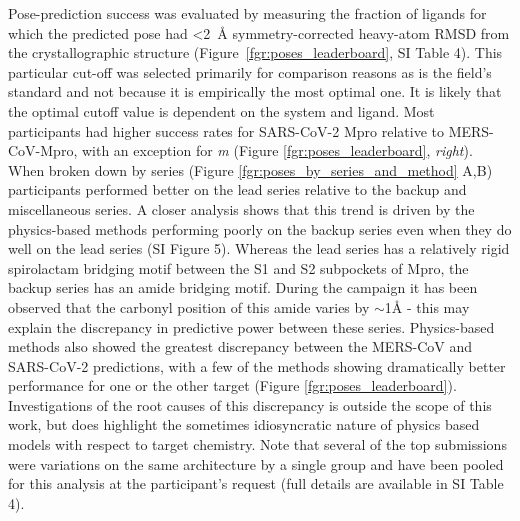 \documentclass[journal=jcim,manuscript=article]{achemso}
\begin{document}
Pose-prediction success was evaluated by measuring the fraction of ligands for which the predicted pose had \textless 2~Å symmetry-corrected heavy-atom RMSD from the crystallographic structure (Figure~\ref{fgr:poses_leaderboard}, SI Table 4). This particular cut-off was selected primarily for comparison reasons as is the field's standard and not because it is empirically the most optimal one. It is likely that the optimal cutoff value is dependent on the system and ligand.\cite{payne_2025, skrinjar_cofold_mem_2025} Most participants had higher success rates for SARS-CoV-2 Mpro relative to MERS-CoV-Mpro, with an exception for \textit{m} (Figure \ref{fgr:poses_leaderboard}, \emph{right}). When broken down by series (Figure \ref{fgr:poses_by_series_and_method} A,B) participants performed better on the lead series relative to the backup and miscellaneous series. A closer analysis shows that this trend is driven by the physics-based methods performing poorly on the backup series even when they do well on the lead series (SI Figure 5). Whereas the lead series has a relatively rigid spirolactam bridging motif between the S1 and S2 subpockets of Mpro, the backup series has an amide bridging motif. During the campaign it has been observed that the carbonyl position of this amide varies by $\sim$1Å - this may explain the discrepancy in predictive power between these series. Physics-based methods also showed the greatest discrepancy between the MERS-CoV and SARS-CoV-2 predictions, with a few of the methods showing dramatically better performance for one or the other target (Figure \ref{fgr:poses_leaderboard}). Investigations of the root causes of this discrepancy is outside the scope of this work, but does highlight the sometimes idiosyncratic nature of physics based models with respect to target chemistry\cite{ross_maximal_2023}. Note that several of the top submissions were variations on the same architecture by a single group and have been pooled for this analysis at the participant's request (full details are available in SI Table 4).
\end{document}
